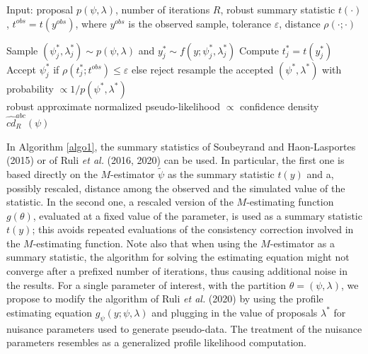 \documentclass[preprint,12pt,authoryear]{elsarticle}
\newcommand{\bb}{\textcolor{blue}}
\begin{document}
\begin{algorithm}[H]
 \caption{Accept-reject robust ABC}
 Input: proposal $p(\psi, \lambda)$, number of iterations $R$, robust summary statistic $t(\cdot)$, $t^{obs}=t(y^{obs})$, where $y^{obs}$ is the observed sample, tolerance $\varepsilon$, distance $\rho(\cdot;\cdot)$
  \begin{algorithmic}
       \State Sample $(\psi_j^*, \lambda_j^*) \sim p(\psi, \lambda)$
 and  $y_j^*\sim f(y;\psi_j^*, \lambda_j^*)$
 \State Compute $t_j^*=t(y_j^*)$ 
\State  Accept $\psi_j^*$ if $ \rho(t_j^*; t^{obs})\leq \varepsilon$ else reject 
 \EndFor
 \State resample  the accepted $(\psi^{*}, \lambda^*)$ with probability $\propto1/p(\psi^*,\lambda^*)$ \\
 \Return    robust approximate normalized pseudo-likelihood $\propto$ confidence density $\hat{cd}_R^{abc} (\psi)$  
 \end{algorithmic} \label{algo1} 
 \end{algorithm}
 
In Algorithm \ref{algo1}, the summary statistics of Soubeyrand and Haon-Lasportes (2015) or of Ruli {\em et al.} (2016, 2020) can be used. In particular, the first one is based directly on the $M$-estimator $\tilde\psi$ as the summary statistic $t(y)$ and a, possibly rescaled, distance among the observed and the simulated value of the statistic. In the second one, a rescaled version of the $M$-estimating function $g(\theta)$, evaluated at a fixed value of the parameter, is used as a summary statistic $t(y)$; this avoids repeated evaluations of the consistency correction involved in the $M$-estimating function. 
Note also that when using the $M$-estimator as a summary statistic, the algorithm for solving the estimating equation might not converge after a prefixed number of iterations, thus causing additional noise in the results.
%
%
For a single parameter of interest, with the partition $\theta=(\psi,\lambda)$, we propose to modify the algorithm of Ruli {\em et al.} (2020) by  using  the profile estimating equation $g_\psi (y;\psi,\lambda)$ and plugging in the value of proposals $\lambda^*$ for nuisance parameters used to generate pseudo-data.
The treatment of the nuisance parameters resembles as a generalized profile likelihood computation.
\bb{}
\end{document}
